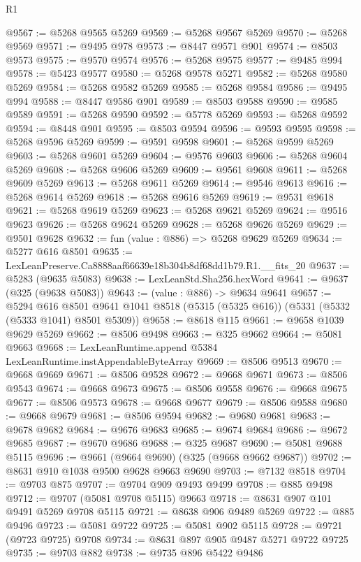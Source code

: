 \begin{lexlean}{R1}
\begin{coremodule}
@9567 := @5268 @9565 @5269
@9569 := @5268 @9567 @5269
@9570 := @5268 @9569
@9571 := @9495 @978
@9573 := @8447 @9571 @901
@9574 := @8503 @9573
@9575 := @9570 @9574
@9576 := @5268 @9575
@9577 := @9485 @994
@9578 := @5423 @9577
@9580 := @5268 @9578 @5271
@9582 := @5268 @9580 @5269
@9584 := @5268 @9582 @5269
@9585 := @5268 @9584
@9586 := @9495 @994
@9588 := @8447 @9586 @901
@9589 := @8503 @9588
@9590 := @9585 @9589
@9591 := @5268 @9590
@9592 := @5778 @5269
@9593 := @5268 @9592
@9594 := @8448 @901
@9595 := @8503 @9594
@9596 := @9593 @9595
@9598 := @5268 @9596 @5269
@9599 := @9591 @9598
@9601 := @5268 @9599 @5269
@9603 := @5268 @9601 @5269
@9604 := @9576 @9603
@9606 := @5268 @9604 @5269
@9608 := @5268 @9606 @5269
@9609 := @9561 @9608
@9611 := @5268 @9609 @5269
@9613 := @5268 @9611 @5269
@9614 := @9546 @9613
@9616 := @5268 @9614 @5269
@9618 := @5268 @9616 @5269
@9619 := @9531 @9618
@9621 := @5268 @9619 @5269
@9623 := @5268 @9621 @5269
@9624 := @9516 @9623
@9626 := @5268 @9624 @5269
@9628 := @5268 @9626 @5269
@9629 := @9501 @9628
@9632 := fun (value : @886) => @5268 @9629 @5269
@9634 := @5277 @616 @8501
@9635 := LexLeanPreserve.Ca8888aaf66639e18b304b8df68dd1b79.R1.__fits_20
@9637 := @5283 (@9635 @5083)
@9638 := LexLeanStd.Sha256.hexWord
@9641 := @9637 (@325 (@9638 @5083))
@9643 := (value : @886) -> @9634 @9641
@9657 := @5294
    @616
    @8501
    @9641
    @1041
    @8518
    (@5315 (@5325 @616))
    (@5331 (@5332 (@5333 @1041) @8501 @5309))
@9658 := @8618 @115
@9661 := @9658 @1039 @9629 @5269
@9662 := @8506 @9498
@9663 := @325 @9662
@9664 := @5081 @9663
@9668 := LexLeanRuntime.append @5384 LexLeanRuntime.instAppendableByteArray
@9669 := @8506 @9513
@9670 := @9668 @9669
@9671 := @8506 @9528
@9672 := @9668 @9671
@9673 := @8506 @9543
@9674 := @9668 @9673
@9675 := @8506 @9558
@9676 := @9668 @9675
@9677 := @8506 @9573
@9678 := @9668 @9677
@9679 := @8506 @9588
@9680 := @9668 @9679
@9681 := @8506 @9594
@9682 := @9680 @9681
@9683 := @9678 @9682
@9684 := @9676 @9683
@9685 := @9674 @9684
@9686 := @9672 @9685
@9687 := @9670 @9686
@9688 := @325 @9687
@9690 := @5081 @9688 @5115
@9696 := @9661 (@9664 @9690) (@325 (@9668 @9662 @9687))
@9702 := @8631 @910 @1038 @9500 @9628 @9663 @9690
@9703 := @7132 @8518
@9704 := @9703 @875
@9707 := @9704 @909 @9493 @9499
@9708 := @885 @9498
@9712 := @9707 (@5081 @9708 @5115) @9663
@9718 := @8631 @907 @101 @9491 @5269 @9708 @5115
@9721 := @8638 @906 @9489 @5269
@9722 := @885 @9496
@9723 := @5081 @9722
@9725 := @5081 @902 @5115
@9728 := @9721 (@9723 @9725) @9708
@9734 := @8631 @897 @905 @9487 @5271 @9722 @9725
@9735 := @9703 @882
@9738 := @9735 @896 @5422 @9486

\end{coremodule}
\end{lexlean}
